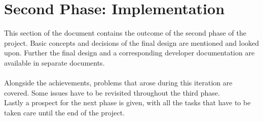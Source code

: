 \section{Second Phase: Implementation}
This section of the document contains the outcome of the second phase of the project. Basic concepts and decisions of the final design are mentioned and looked upon. Further the final design and a corresponding developer documentation are available in separate documents. \\
~\\
Alongside the achievements, problems that arose during this iteration are covered. Some issues have to be revisited throughout the third phase. \\
Lastly a prospect for the next phase is given, with all the tasks that have to be taken care until the end of the project. 